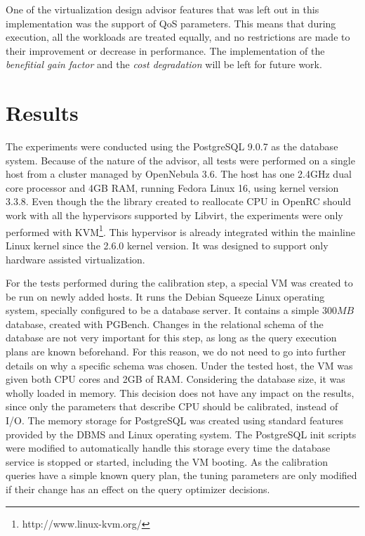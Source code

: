 \documentclass[jidm,a4paper]{jidm} %
\begin{document}
One of the virtualization design advisor  features that was left out in this implementation was the support of QoS parameters. This means that during execution, all the workloads are treated equally, and no restrictions are made to their improvement or decrease in performance. The implementation of the \textit{benefitial gain factor} and the \textit{cost degradation} will be left for future work.

\section{Results}

\label{chap:results}

The experiments were conducted using the PostgreSQL 9.0.7 as the database system. Because of the nature of the advisor, all tests were performed on a single host from a cluster managed by OpenNebula 3.6. The host has one 2.4GHz dual core processor and 4GB RAM, running Fedora Linux 16, using kernel version 3.3.8. Even though the the library created to reallocate CPU in OpenRC should work with all the hypervisors supported by Libvirt, the experiments were only performed with KVM\footnote{http://www.linux-kvm.org/}. This hypervisor is already integrated within the mainline Linux kernel since the 2.6.0 kernel version. It was designed to support only hardware assisted virtualization.

For the tests performed during the calibration step, a special VM was created to be run on newly added hosts. It runs the Debian Squeeze Linux operating system, specially configured to be a database server. It contains a simple $300MB$ database, created with PGBench. Changes in the relational schema of the database are not very important for this step, as long as the query execution plans are known beforehand. For this reason, we do not need to go into further details on why a specific schema was chosen. Under the tested host, the VM was given both CPU cores and 2GB of RAM. Considering the database size, it was wholly loaded in memory. This decision does not have any impact on the results, since only the parameters that describe CPU should be calibrated, instead of I/O. The memory storage for PostgreSQL was created using standard features provided by the DBMS and Linux operating system. The PostgreSQL init scripts were modified to automatically handle this storage every time the database service is stopped 
or started, including the VM booting. As the calibration queries have a simple known query plan, the tuning parameters are only modified if their change has an effect on the query optimizer decisions.
\end{document}
